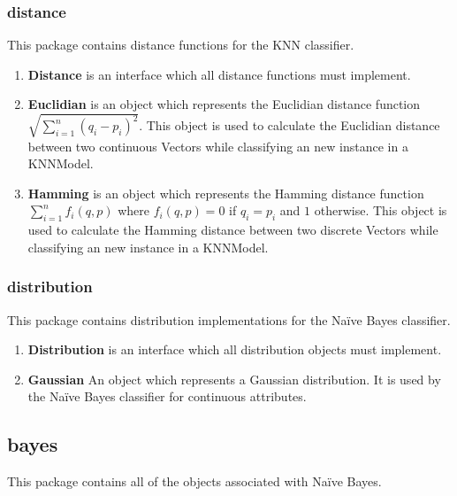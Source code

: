 \documentclass[11pt,titlepage]{article}
\newcommand{\bb}{\textbf}
\begin{document}
\subsubsection{distance}
This package contains distance functions for the KNN classifier.

\begin{enumerate}[leftmargin=*]
  \item[] \bb{Distance} is an interface which all distance functions must implement.
  \item[] \bb{Euclidian} is an object which represents the Euclidian distance function $\sqrt{\sum_{i=1}^{n}(q_i-p_i)^2}$. This object is used to calculate the Euclidian distance between two continuous Vectors while classifying an new instance in a KNNModel.
  \item[] \bb{Hamming} is an object which represents the Hamming distance function $\sum_{i=1}^{n}f_i(q, p)$ where $f_i(q, p) = 0$ if $q_i = p_i$ and $1$ otherwise. This object is used to calculate the Hamming distance between two discrete Vectors while classifying an new instance in a KNNModel.
\end{enumerate}

\subsubsection{distribution}
This package contains distribution implementations for the Naïve Bayes classifier.

\begin{enumerate}[leftmargin=*]
  \item[] \bb{Distribution} is an interface which all distribution objects must implement.
  \item[] \bb{Gaussian} An object which represents a Gaussian distribution. It is used by the Naïve Bayes classifier for continuous attributes.
\end{enumerate}

\subsection{bayes}
This package contains all of the objects associated with Naïve Bayes.
\end{document}
